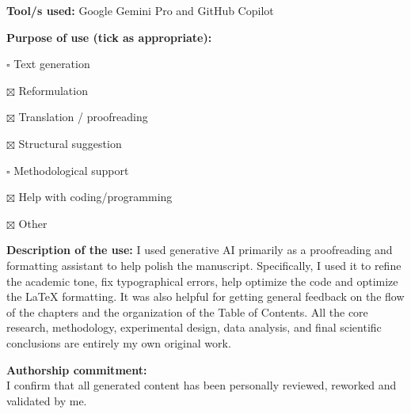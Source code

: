 \noindent\textbf{Tool/s used:}
Google Gemini Pro and GitHub Copilot

\vspace{2em}
\noindent\textbf{Purpose of use (tick as appropriate):}

$\square$ Text generation

$\boxtimes$ Reformulation

$\boxtimes$ Translation / proofreading

$\boxtimes$ Structural suggestion

$\square$ Methodological support

$\boxtimes$ Help with coding/programming

$\boxtimes$ Other

\vspace{1em}
\noindent\textbf{Description of the use:}
I used generative AI primarily as a proofreading and formatting assistant to help polish the manuscript. Specifically, I used it to refine the academic tone, fix typographical errors, help optimize the code and optimize the LaTeX formatting. It was also helpful for getting general feedback on the flow of the chapters and the organization of the Table of Contents. All the core research, methodology, experimental design, data analysis, and final scientific conclusions are entirely my own original work.


\vspace{3em}
\noindent\textbf{Authorship commitment:}\\
I confirm that all generated content has been personally reviewed, reworked and validated by me.

